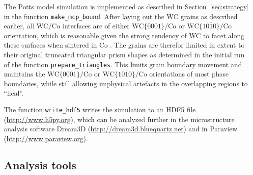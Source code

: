\documentclass[3p,12pt]{elsarticle}
\begin{document}
The Potts model simulation is implemented as described in Section~\ref{sec:strategy} in the function \verb|make_mcp_bound|.
After laying out the WC grains as described earlier, all WC/Co interfaces are of either $\text{WC}\{0001\}/\text{Co}$ or $\text{WC}\{10\bar{1}0\}/\text{Co}$ orientation, which is reasonable given the strong tendency of WC to facet along these surfaces when sintered in Co \cite{kim_interface_2008}.
The grains are therefor limited in extent to their original truncated triangular prism shapes as determined in the initial run of the function \verb|prepare_triangles|.
This limits grain boundary movement and maintains the $\text{WC}\{0001\}/\text{Co}$ or $\text{WC}\{10\bar{1}0\}/\text{Co}$ orientations of most phase boundaries, while still allowing unphysical artefacts in the overlapping regions to ``heal''.
% 

The function \verb|write_hdf5| writes the simulation to an HDF5 file (\url{http://www.h5py.org}), which can be analyzed further in the microstructure analysis software Dream3D (\url{http://dream3d.bluequartz.net}) and in Paraview (\url{http://www.paraview.org}).


\subsection{Analysis tools} \label{sec:analysis_tools}
\end{document}
